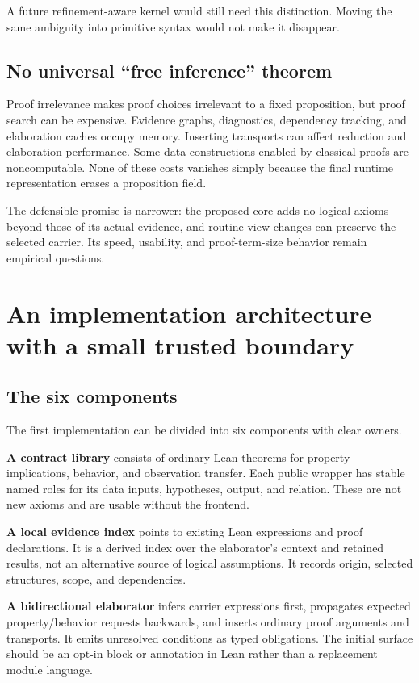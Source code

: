 \documentclass[11pt,letterpaper]{article}
\theoremstyle{definition}
\theoremstyle{remark}
\begin{document}
A future refinement-aware kernel would still need this distinction. Moving the
same ambiguity into primitive syntax would not make it disappear.

\subsection{No universal ``free inference'' theorem}
Proof irrelevance makes proof choices irrelevant to a fixed proposition, but
proof search can be expensive. Evidence graphs, diagnostics, dependency
tracking, and elaboration caches occupy memory. Inserting transports can affect
reduction and elaboration performance. Some data constructions enabled by
classical proofs are noncomputable. None of these costs vanishes simply because
the final runtime representation erases a proposition field.

The defensible promise is narrower: the proposed core adds no logical axioms
beyond those of its actual evidence, and routine view changes can preserve the
selected carrier. Its speed, usability, and proof-term-size behavior remain
empirical questions.

\section{An implementation architecture with a small trusted boundary}\label{sec:implementation}

\subsection{The six components}
The first implementation can be divided into six components with clear owners.

\textbf{A contract library} consists of ordinary Lean theorems for property
implications, behavior, and observation transfer. Each public wrapper has
stable named roles for its data inputs, hypotheses, output, and relation.
These are not new axioms and are usable without the frontend.

\textbf{A local evidence index} points to existing Lean expressions and proof
declarations. It is a derived index over the elaborator's context and retained
results, not an alternative source of logical assumptions. It records origin,
selected structures, scope, and dependencies.

\textbf{A bidirectional elaborator} infers carrier expressions first, propagates
expected property/behavior requests backwards, and inserts ordinary proof
arguments and transports. It emits unresolved conditions as typed obligations.
The initial surface should be an opt-in block or annotation in Lean rather than
a replacement module language.
\end{document}
